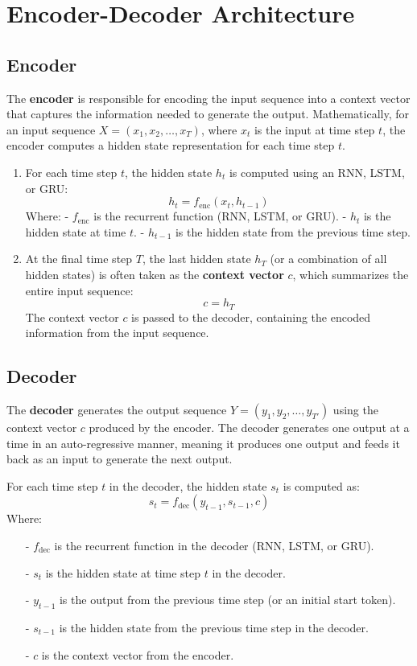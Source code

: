 \documentclass[10pt]{article}
\begin{document}
\section{Encoder-Decoder Architecture}

\subsection{Encoder}
The {\bf encoder} is responsible for encoding the input sequence into a context vector that captures the information needed to generate the output. Mathematically, for an input sequence \( X = (x_1, x_2, \dots, x_T) \), where \( x_t \) is the input at time step \( t \), the encoder computes a hidden state representation for each time step \( t \).

\begin{enumerate}
   \item For each time step \( t \), the hidden state \( h_t \) is computed using an RNN, LSTM, or GRU:
      \[
      h_t = f_{\text{enc}}(x_t, h_{t-1})
      \]
      Where:
      - \( f_{\text{enc}} \) is the recurrent function (RNN, LSTM, or GRU).
      - \( h_t \) is the hidden state at time \( t \).
      - \( h_{t-1} \) is the hidden state from the previous time step.
   
   \item At the final time step \( T \), the last hidden state \( h_T \) (or a combination of all hidden states) is often taken as the {\bf context vector} \( c \), which summarizes the entire input sequence:
      \[
      c = h_T
      \]
      The context vector \( c \) is passed to the decoder, containing the encoded information from the input sequence.
\end{enumerate}

\subsection{Decoder}
The {\bf decoder} generates the output sequence \( Y = (y_1, y_2, \dots, y_{T'}) \) using the context vector \( c \) produced by the encoder. The decoder generates one output at a time in an auto-regressive manner, meaning it produces one output and feeds it back as an input to generate the next output.

For each time step \( t \) in the decoder, the hidden state \( s_t \) is computed as:
\[
s_t = f_{\text{dec}}(y_{t-1}, s_{t-1}, c)
\]
Where:

\begin{itemize}
   \item [-] \( f_{\text{dec}} \) is the recurrent function in the decoder (RNN, LSTM, or GRU).
   \item [-] \( s_t \) is the hidden state at time step \( t \) in the decoder.
   \item [-] \( y_{t-1} \) is the output from the previous time step (or an initial start token).
   \item [-] \( s_{t-1} \) is the hidden state from the previous time step in the decoder.
   \item [-] \( c \) is the context vector from the encoder.
\end{itemize}
\end{document}
